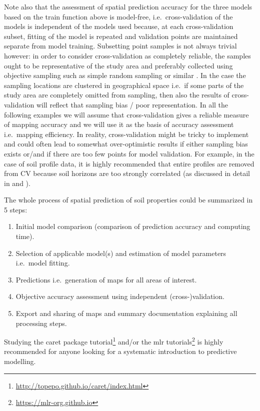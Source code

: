 \documentclass[graybox,natbib,nospthms,UStrade]{svmono}
\providecommand{\tightlist}{%
  \setlength{\itemsep}{0pt}\setlength{\parskip}{0pt}}
\providecommand{\tightlist}{\setlength{\itemsep}{0pt}\setlength{\parskip}{0pt}}
\renewcommand{\href}[2]{#2 (\url{#1})}
\renewcommand{\href}[2]{#2\footnote{\url{#1}}}
\begin{document}
Note also that the assessment of spatial prediction accuracy for the three models based on the train function above is model-free, i.e.~cross-validation of the models is independent of the models used because, at each cross-validation subset, fitting of the model is repeated and validation points are maintained separate from model training. Subsetting point samples is not always trivial however: in order to consider cross-validation as completely reliable, the samples ought to be representative of the study area and preferably collected using objective sampling such as simple random sampling or similar \citep{Brus2011EJSS}. In the case the sampling locations are clustered in geographical space i.e.~if some parts of the study area are completely omitted from sampling, then also the results of cross-validation will reflect that sampling bias / poor representation. In all the following examples we will assume that cross-validation gives a reliable measure of mapping accuracy and we will use it as the basis of accuracy assessment i.e.~mapping efficiency. In reality, cross-validation might be tricky to implement and could often lead to somewhat over-optimistic results if either sampling bias exists or/and if there are too few points for model validation. For example, in the case of soil profile data, it is highly recommended that entire profiles are removed from CV because soil horizons are too strongly correlated (as discussed in detail in \citet{Gasch2015SPASTA} and \citet{Brenning2012}).

The whole process of spatial prediction of soil properties could be summarized in 5 steps:

\begin{enumerate}
\def\labelenumi{\arabic{enumi}.}
\tightlist
\item
  Initial model comparison (comparison of prediction accuracy and computing time).
\item
  Selection of applicable model(s) and estimation of model parameters i.e.~model fitting.
\item
  Predictions i.e.~generation of maps for all areas of interest.
\item
  Objective accuracy assessment using independent (cross-)validation.
\item
  Export and sharing of maps and summary documentation explaining all processing steps.
\end{enumerate}

Studying the \href{http://topepo.github.io/caret/index.html}{caret package tutorial}
and/or the \href{https://mlr-org.github.io}{mlr tutorials} is highly recommended for anyone looking
for a systematic introduction to predictive modelling.
\end{document}
